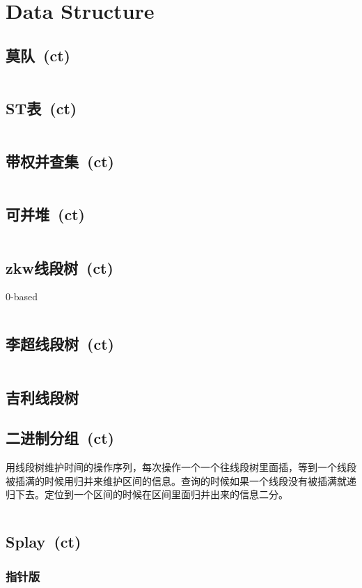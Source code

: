 \chapter{Data Structure}
\section{莫队\ \small(ct)}
	\inputminted{cpp}{DataStructure/mo_dui.cpp}
\section{ST表\ \small(ct)}
	\inputminted{cpp}{DataStructure/st_table.cpp}
\section{带权并查集\ \small(ct)}
	\inputminted{cpp}{DataStructure/union_find_weighted.cpp}
\section{可并堆\ \small(ct)}
	\inputminted{cpp}{DataStructure/mergeable_heap.cpp}
\section{zkw线段树\ \small(ct)}
	$ 0 $-based
	\inputminted{cpp}{DataStructure/zkw_segment_tree.cpp}
\section{李超线段树\ \small(ct)}
	\inputminted{cpp}{DataStructure/li_chao_segment_tree.cpp}
\section{吉利线段树}
\section{二进制分组\ \small(ct)}
	用线段树维护时间的操作序列，每次操作一个一个往线段树里面插，等到一个线段被插满的时候用归并来维护区间的信息。查询的时候如果一个线段没有被插满就递归下去。定位到一个区间的时候在区间里面归并出来的信息二分。
	\inputminted{cpp}{DataStructure/binary_group.cpp}
\section{Splay\ \small(ct)}
	\subsection*{指针版}
		\inputminted{cpp}{DataStructure/splay.cpp}
